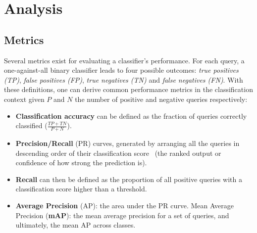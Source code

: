

\section{Analysis} \label{sec:analysis}

\subsection{Metrics}
Several metrics exist for evaluating a classifier's performance. For each query, a one-against-all binary classifier leads to four possible outcomes: \emph{true positives (TP)}, \emph{false positives (FP)}, \emph{true negatives (TN)} and \emph{false negatives (FN)}. With these definitions, one can derive common performance metrics in the classification context given $P$ and $N$ the number of positive and negative queries respectively: 

\begin{itemize}

\item \textbf{Classification accuracy} can be defined as the fraction of queries correctly classified ($\frac{TP+TN}{P+N}$). 

\item \textbf{Precision/Recall} (PR) curves, generated by arranging all the queries in descending order of their classification score~\cite{Everingham2009} (\ie the ranked output or confidence of how strong the prediction is). 

\item \textbf{Recall} can then be defined as the proportion of all positive queries with a classification score higher than a threshold. 

\item \textbf{Average Precision} (AP): the area under the PR curve. Mean Average Precision (\textbf{mAP}): the mean average precision for a set of queries, and ultimately, the mean AP across classes.

\end{itemize}

